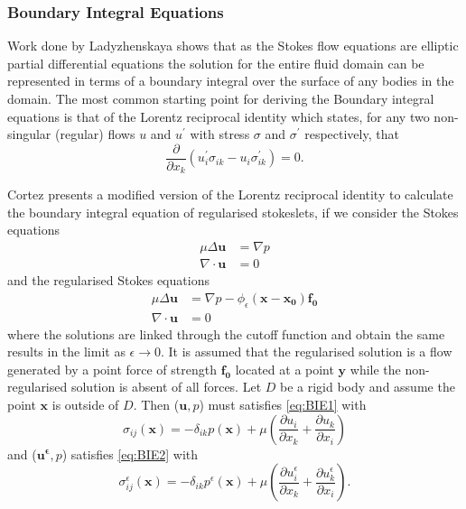 \subsubsection{Boundary Integral Equations}
Work done by Ladyzhenskaya \cite{ladyzhenskaya1969mathematical} shows that as the Stokes flow equations are elliptic partial differential equations the solution for the entire fluid domain can be represented in terms of a boundary integral over the surface of any bodies in the domain. The most common starting point for deriving the Boundary integral equations is that of the Lorentz reciprocal identity which states, for any two non-singular (regular) flows $u$ and $u^\prime$ with stress $\sigma$ and $\sigma^\prime$ respectively, that
\begin{equation*}
    \frac{\partial}{\partial x_k}(u_i^\prime\sigma_{ik} - u_i \sigma^\prime_{ik}) = 0.
\end{equation*}

Cortez presents a modified version of the Lorentz reciprocal identity to calculate the boundary integral equation of regularised stokeslets, if we consider the Stokes equations
\begin{equation}
    \label{eq:BIE1}
\begin{aligned}
      \mu\Delta\boldsymbol{u} &= \nabla p \\
      \nabla \cdot \boldsymbol{u} &= 0
\end{aligned}
\end{equation}
and the regularised Stokes equations
\begin{equation}
    \label{eq:BIE2}
\begin{aligned}
      \mu\Delta\boldsymbol{u} &= \nabla p - \phi_{\epsilon}(\bm{x}-\bm{x_0})\bm{f_0} \\
      \nabla \cdot \boldsymbol{u} &= 0
\end{aligned}
\end{equation}
where the solutions are linked through the cutoff function and obtain the same results in the limit as $\epsilon \to 0$. It is assumed that the regularised solution is a flow generated by a point force of strength $\bm{f_0}$ located at a point $\bm{y}$ while the non-regularised solution is absent of all forces. Let $D$ be a rigid body and assume the point $\bm{x}$ is outside of $D$. Then ($\bm{u},p$) must satisfies \cref{eq:BIE1} with
\begin{equation*}
\sigma_{ij}(\bm{x}) = -\delta_{ik}p(\bm{x}) + \mu\left( \frac{\partial u_i}{\partial x_k} + \frac{\partial u_k}{\partial x_i} \right)
\end{equation*}
and ($\bm{u^\epsilon},p$) satisfies \cref{eq:BIE2} with
\begin{equation*}
\sigma^\epsilon_{ij}(\bm{x}) = -\delta_{ik}p^\epsilon(\bm{x}) + \mu\left( \frac{\partial u^\epsilon_i}{\partial x_k} + \frac{\partial u^\epsilon_k}{\partial x_i} \right).
\end{equation*}

